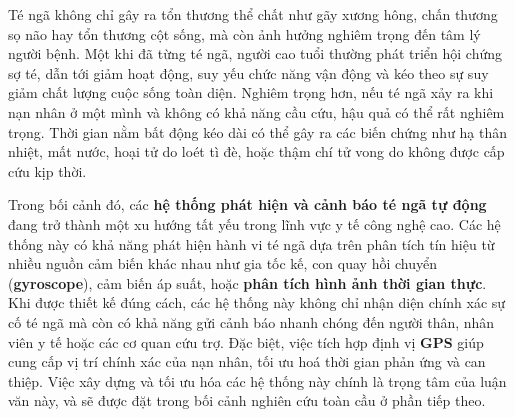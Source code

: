 Té ngã không chỉ gây ra tổn thương thể chất như gãy xương hông, chấn thương sọ não hay tổn thương cột sống, mà còn ảnh hưởng nghiêm trọng đến tâm lý người bệnh. Một khi đã từng té ngã, người cao tuổi thường phát triển hội chứng sợ té, dẫn tới giảm hoạt động, suy yếu chức năng vận động và kéo theo sự suy giảm chất lượng cuộc sống toàn diện. Nghiêm trọng hơn, nếu té ngã xảy ra khi nạn nhân ở một mình và không có khả năng cầu cứu, hậu quả có thể rất nghiêm trọng. Thời gian nằm bất động kéo dài có thể gây ra các biến chứng như hạ thân nhiệt, mất nước, hoại tử do loét tì đè, hoặc thậm chí tử vong do không được cấp cứu kịp thời.

Trong bối cảnh đó, các \textbf{hệ thống phát hiện và cảnh báo té ngã tự động} đang trở thành một xu hướng tất yếu trong lĩnh vực y tế công nghệ cao. Các hệ thống này có khả năng phát hiện hành vi té ngã dựa trên phân tích tín hiệu từ nhiều nguồn cảm biến khác nhau như gia tốc kế, con quay hồi chuyển (\textbf{gyroscope}), cảm biến áp suất, hoặc \textbf{phân tích hình ảnh thời gian thực}. Khi được thiết kế đúng cách, các hệ thống này không chỉ nhận diện chính xác sự cố té ngã mà còn có khả năng gửi cảnh báo nhanh chóng đến người thân, nhân viên y tế hoặc các cơ quan cứu trợ. Đặc biệt, việc tích hợp định vị \textbf{GPS} giúp cung cấp vị trí chính xác của nạn nhân, tối ưu hoá thời gian phản ứng và can thiệp. Việc xây dựng và tối ưu hóa các hệ thống này chính là trọng tâm của luận văn này, và sẽ được đặt trong bối cảnh nghiên cứu toàn cầu ở phần tiếp theo.
